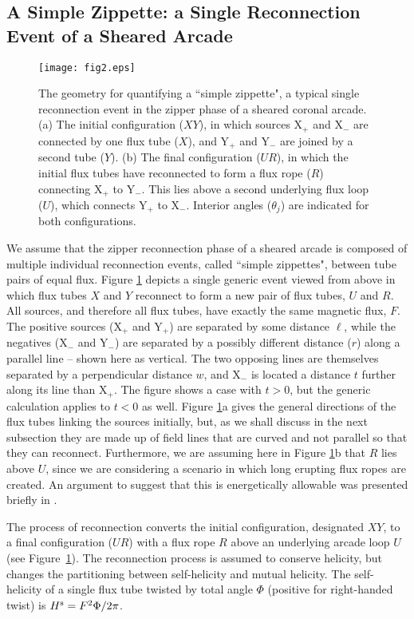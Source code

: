 \documentclass[10pt,namedreferneces]{SolarPhysics}
\begin{document}
\begin{article}
\subsection{\bf A Simple Zippette: a Single Reconnection Event of a Sheared Arcade} 
\label{sect_3.1}
\begin{figure}[h]
{\centering
 \texttt{[image: fig2.eps]}
\caption{The geometry for quantifying a ``simple zippette", a typical single reconnection event in the zipper phase of a sheared coronal arcade.  (a) The initial configuration ($XY$), in which sources X$_+$ and X$_-$ are connected by one flux tube ($X$), and  Y$_+$ and Y$_-$ are joined by a second tube ($Y$).  (b) The final configuration ($UR$), in which the initial flux tubes have reconnected to form a flux rope ($R$) connecting X$_+$ to Y$_-$.  This lies above a second underlying flux loop ($U$), which connects Y$_+$ to X$_-$.  Interior angles ($\theta_j$) are indicated for both configurations.}
\label{fig2}}
\end{figure}
We assume that the zipper reconnection phase of a sheared arcade is composed of multiple individual reconnection events, called ``simple zippettes", between tube pairs of equal flux.  Figure \ref{fig2} depicts a single generic event viewed from above in which flux tubes $X$ and $Y$ reconnect to form a new pair of flux tubes, $U$ and $R$.  All sources, and therefore all flux tubes, have exactly the  same magnetic flux, $F$.  The positive sources (X$_+$ and Y$_+$) are separated by some distance $\ell$, while the negatives (X$_-$ and Y$_-$) are separated by a possibly different distance ($r$) along a parallel line -- shown here as vertical.  The two opposing lines are themselves separated by a perpendicular distance $w$, and X$_-$ is located a distance $t$ further along its line than X$_+$.  The figure shows a case with $t>0$, but the generic calculation applies to $t<0$ as well.
Figure \ref{fig2}a gives the general directions of the flux tubes linking the sources initially, but, as we shall discuss in the next subsection they are made up of field lines that are curved and not parallel so that they can reconnect.  Furthermore, we are assuming here in Figure \ref{fig2}b that $R$ lies above $U$, since we are considering a scenario in which long erupting flux ropes are created. An argument to suggest that this is energetically allowable was presented briefly in .

The process of reconnection converts the initial configuration, designated $XY$, to a final configuration ($UR$) with a flux rope $R$ above an underlying arcade loop $U$ (see Figure\ \ref{fig2}).  The reconnection process is assumed to conserve helicity, but changes the partitioning between self-helicity and mutual helicity.  The self-helicity of a single flux tube twisted by total angle $\Phi$ (positive for right-handed twist) is $H^{\rm s} =F^2\Phi/2\pi$.


\end{article}
\end{document}
